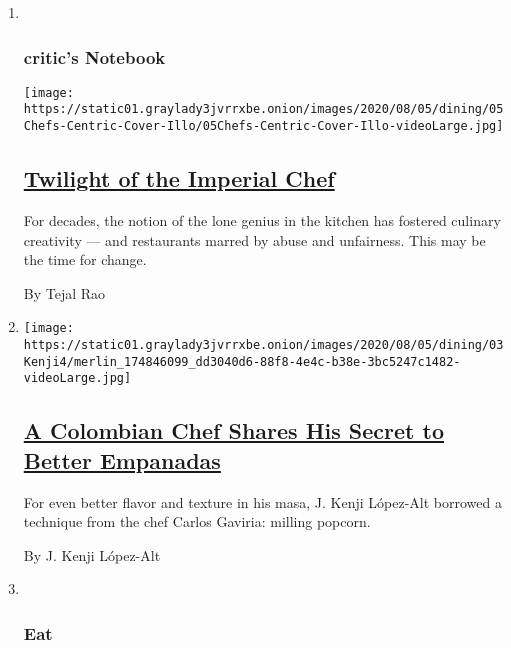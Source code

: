 \begin{enumerate}
\def\labelenumi{\arabic{enumi}.}
\item ~
  \hypertarget{critics-notebook}{%
  \subsubsection{critic's Notebook}\label{critics-notebook}}

  \texttt{[image: https://static01.graylady3jvrrxbe.onion/images/2020/08/05/dining/05Chefs-Centric-Cover-Illo/05Chefs-Centric-Cover-Illo-videoLarge.jpg]}

  \hypertarget{twilight-of-the-imperial-chef}{%
  \subsection{\texorpdfstring{\href{/2020/08/04/dining/chef-restaurant-culture.html}{Twilight
  of the Imperial
  Chef}}{Twilight of the Imperial Chef}}\label{twilight-of-the-imperial-chef}}

  For decades, the notion of the lone genius in the kitchen has fostered
  culinary creativity --- and restaurants marred by abuse and
  unfairness. This may be the time for change.

  By Tejal Rao
\item
  \texttt{[image: https://static01.graylady3jvrrxbe.onion/images/2020/08/05/dining/03Kenji4/merlin\_174846099\_dd3040d6-88f8-4e4c-b38e-3bc5247c1482-videoLarge.jpg]}

  \hypertarget{a-colombian-chef-shares-his-secret-to-better-empanadas}{%
  \subsection{\texorpdfstring{\href{/2020/08/04/dining/colombian-empanadas-carlos-gaviria.html}{A
  Colombian Chef Shares His Secret to Better
  Empanadas}}{A Colombian Chef Shares His Secret to Better Empanadas}}\label{a-colombian-chef-shares-his-secret-to-better-empanadas}}

  For even better flavor and texture in his masa, J. Kenji López-Alt
  borrowed a technique from the chef Carlos Gaviria: milling popcorn.

  By J. Kenji López-Alt
\item ~
  \hypertarget{eat}{%
  \subsubsection{Eat}\label{eat}}


\end{enumerate}

